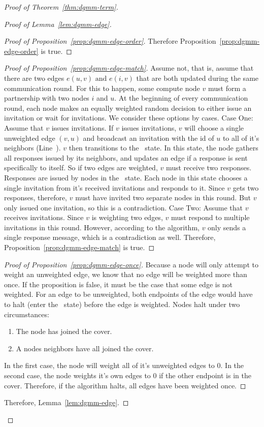 \begin{proof}[Proof of Theorem~\ref{thm:dgmm-term}]
\begin{proof}[Proof of Lemma~\ref{lem:dgmm-edge}]
\begin{proof}[Proof of Proposition~\ref{prop:dgmm-edge-order}]
    Therefore Proposition~\ref{prop:dgmm-edge-order} is true.
  \end{proof}
  \begin{proof}[Proof of Proposition~\ref{prop:dgmm-edge-match}]
    Assume not, that is, assume that there are two edges $e(u,v) \text{ and } e(i,v)$ that are both updated during the same communication round. For this to happen, some compute node $v$ must form a partnership with two nodes $i$ and $u$. 
    At the beginning of every communication round, each node makes an equally weighted random decision to either issue an invitation or wait for invitations. We consider these options by cases.
    Case One: Assume that $v$ issues invitations. If $v$ issues invitations, $v$ will choose a single unweighted edge $(v,u)$ and broadcast an invitation with the id of $u$ to all of it's neighbors (Line~). $v$ then transitions to the \cWd\ state. In this state, the node gathers all responses issued by its neighbors, and updates an edge if a response is sent specifically to itself.
    So if two edges are weighted, $v$ must receive two responses.
    Responses are issued by nodes in the \cRd\ state. Each node in this state chooses a single invitation from it's received invitations and responds to it. Since $v$ gets two responses, therefore, $v$ must have invited two separate nodes in this round. But $v$ only issued one invitation, so this is a contradiction.
    Case Two: Assume that $v$ receives invitations. Since $v$ is weighting two edges, $v$ must respond to multiple invitations in this round. However, according to the algorithm, $v$ only sends a single response message, which is a contradiction as well.
    Therefore, Proposition~\ref{prop:dgmm-edge-match} is true.
  \end{proof}
  \begin{proof}[Proof of Proposition~\ref{prop:dgmm-edge-once}]
    Because a node will only attempt to weight an unweighted edge, we know that no edge will be weighted more than once. If the proposition is false, it must be the case that some edge is not weighted.
    For an edge to be unweighted, both endpoints of the edge would have to halt (enter the \cDd\ state) before the edge is weighted. Nodes halt under two circumstances:
    \begin{enumerate}
    \item The node has joined the cover.
    \item A nodes neighbors have all joined the cover.
    \end{enumerate}
    In the first case, the node will weight all of it's unweighted edges to 0. In the second case, the node weights it's own edges to 0 if the other endpoint is in the cover.
    Therefore, if the algorithm halts, all edges have been weighted once.
  \end{proof}
  Therefore, Lemma~\ref{lem:dgmm-edge}.
\end{proof}


\end{proof}
